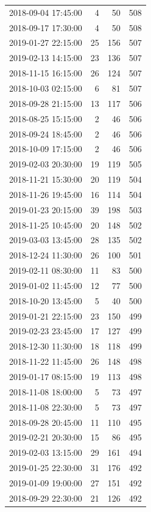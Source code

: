 \begin{tabular}{lrrr}
2018-09-04 17:45:00 & 4 & 50 & 508 \\
2018-09-17 17:30:00 & 4 & 50 & 508 \\
2019-01-27 22:15:00 & 25 & 156 & 507 \\
2019-02-13 14:15:00 & 23 & 136 & 507 \\
2018-11-15 16:15:00 & 26 & 124 & 507 \\
2018-10-03 02:15:00 & 6 & 81 & 507 \\
2018-09-28 21:15:00 & 13 & 117 & 506 \\
2018-08-25 15:15:00 & 2 & 46 & 506 \\
2018-09-24 18:45:00 & 2 & 46 & 506 \\
2018-10-09 17:15:00 & 2 & 46 & 506 \\
2019-02-03 20:30:00 & 19 & 119 & 505 \\
2018-11-21 15:30:00 & 20 & 119 & 504 \\
2018-11-26 19:45:00 & 16 & 114 & 504 \\
2019-01-23 20:15:00 & 39 & 198 & 503 \\
2018-11-25 10:45:00 & 20 & 148 & 502 \\
2019-03-03 13:45:00 & 28 & 135 & 502 \\
2018-12-24 11:30:00 & 26 & 100 & 501 \\
2019-02-11 08:30:00 & 11 & 83 & 500 \\
2019-01-02 11:45:00 & 12 & 77 & 500 \\
2018-10-20 13:45:00 & 5 & 40 & 500 \\
2019-01-21 22:15:00 & 23 & 150 & 499 \\
2019-02-23 23:45:00 & 17 & 127 & 499 \\
2018-12-30 11:30:00 & 18 & 118 & 499 \\
2018-11-22 11:45:00 & 26 & 148 & 498 \\
2019-01-17 08:15:00 & 19 & 113 & 498 \\
2018-11-08 18:00:00 & 5 & 73 & 497 \\
2018-11-08 22:30:00 & 5 & 73 & 497 \\
2018-09-28 20:45:00 & 11 & 110 & 495 \\
2019-02-21 20:30:00 & 15 & 86 & 495 \\
2019-02-03 13:15:00 & 29 & 161 & 494 \\
2019-01-25 22:30:00 & 31 & 176 & 492 \\
2019-01-09 19:00:00 & 27 & 151 & 492 \\
2018-09-29 22:30:00 & 21 & 126 & 492 \\

\end{tabular}
